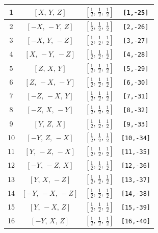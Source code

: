 \documentclass[fleqn,8pt]{jsarticle}
\begin{document}
\begin{longtable}{cccc}
1 & $\left[ X,\, Y,\, Z \right]$ & $\left[ \frac{1}{2},\, \frac{1}{2},\, \frac{1}{2} \right]$ & {\tt [1,-25]} \\ \hline
2 & $\left[ - X,\, - Y,\, Z \right]$ & $\left[ \frac{1}{2},\, \frac{1}{2},\, \frac{1}{2} \right]$ & {\tt [2,-26]} \\ \hline
3 & $\left[ - X,\, Y,\, - Z \right]$ & $\left[ \frac{1}{2},\, \frac{1}{2},\, \frac{1}{2} \right]$ & {\tt [3,-27]} \\ \hline
4 & $\left[ X,\, - Y,\, - Z \right]$ & $\left[ \frac{1}{2},\, \frac{1}{2},\, \frac{1}{2} \right]$ & {\tt [4,-28]} \\ \hline
5 & $\left[ Z,\, X,\, Y \right]$ & $\left[ \frac{1}{2},\, \frac{1}{2},\, \frac{1}{2} \right]$ & {\tt [5,-29]} \\ \hline
6 & $\left[ Z,\, - X,\, - Y \right]$ & $\left[ \frac{1}{2},\, \frac{1}{2},\, \frac{1}{2} \right]$ & {\tt [6,-30]} \\ \hline
7 & $\left[ - Z,\, - X,\, Y \right]$ & $\left[ \frac{1}{2},\, \frac{1}{2},\, \frac{1}{2} \right]$ & {\tt [7,-31]} \\ \hline
8 & $\left[ - Z,\, X,\, - Y \right]$ & $\left[ \frac{1}{2},\, \frac{1}{2},\, \frac{1}{2} \right]$ & {\tt [8,-32]} \\ \hline
9 & $\left[ Y,\, Z,\, X \right]$ & $\left[ \frac{1}{2},\, \frac{1}{2},\, \frac{1}{2} \right]$ & {\tt [9,-33]} \\ \hline
10 & $\left[ - Y,\, Z,\, - X \right]$ & $\left[ \frac{1}{2},\, \frac{1}{2},\, \frac{1}{2} \right]$ & {\tt [10,-34]} \\ \hline
11 & $\left[ Y,\, - Z,\, - X \right]$ & $\left[ \frac{1}{2},\, \frac{1}{2},\, \frac{1}{2} \right]$ & {\tt [11,-35]} \\ \hline
12 & $\left[ - Y,\, - Z,\, X \right]$ & $\left[ \frac{1}{2},\, \frac{1}{2},\, \frac{1}{2} \right]$ & {\tt [12,-36]} \\ \hline
13 & $\left[ Y,\, X,\, - Z \right]$ & $\left[ \frac{1}{2},\, \frac{1}{2},\, \frac{1}{2} \right]$ & {\tt [13,-37]} \\ \hline
14 & $\left[ - Y,\, - X,\, - Z \right]$ & $\left[ \frac{1}{2},\, \frac{1}{2},\, \frac{1}{2} \right]$ & {\tt [14,-38]} \\ \hline
15 & $\left[ Y,\, - X,\, Z \right]$ & $\left[ \frac{1}{2},\, \frac{1}{2},\, \frac{1}{2} \right]$ & {\tt [15,-39]} \\ \hline
16 & $\left[ - Y,\, X,\, Z \right]$ & $\left[ \frac{1}{2},\, \frac{1}{2},\, \frac{1}{2} \right]$ & {\tt [16,-40]} \\ \hline

\end{longtable}
\end{document}
